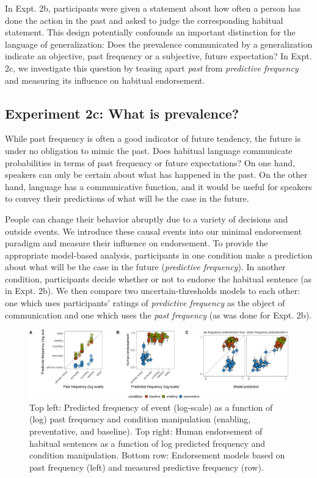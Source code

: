 \documentclass[english,floatsintext,man]{apa6}
\theoremstyle{definition}
\theoremstyle{definition}
\theoremstyle{definition}
\theoremstyle{remark}
\begin{document}
In Expt. 2b, participants were given a statement about how often a
person has done the action in the past and asked to judge the
corresponding habitual statement. This design potentially confounds an
important distinction for the language of generalization: Does the
prevalence communicated by a generalization indicate an objective, past
frequency or a subjective, future expectation? In Expt. 2c, we
investigate this question by teasing apart \emph{past} from
\emph{predictive frequency} and measuring its influence on habitual
endorsement.

\subsection{Experiment 2c: What is
prevalence?}\label{experiment-2c-what-is-prevalence}

While past frequency is often a good indicator of future tendency, the
future is under no obligation to mimic the past. Does habitual language
communicate probabilities in terms of past frequency or future
expectations? On one hand, speakers can only be certain about what has
happened in the past. On the other hand, language has a communicative
function, and it would be useful for speakers to convey their
predictions of what will be the case in the future.

People can change their behavior abruptly due to a variety of decisions
and outside events. We introduce these causal events into our minimal
endorsement paradigm and measure their influence on endorsement. To
provide the appropriate model-based analysis, participants in one
condition make a prediction about what will be the case in the future
(\emph{predictive frequency}). In another condition, participants decide
whether or not to endorse the habitual sentence (as in Expt. 2b). We
then compare two uncertain-thresholds models to each other: one which
uses participants' ratings of \emph{predictive frequency} as the object
of communication and one which uses the \emph{past frequency} (as was
done for Expt. 2b).

\begin{figure}[htbp]
\centering
\includegraphics{figs/habituals-predictive-figure-1.pdf}
\caption{\label{fig:habituals-predictive-figure}Top left: Predicted
frequency of event (log-scale) as a function of (log) past frequency and
condition manipulation (enabling, preventative, and baseline). Top
right: Human endorsement of habitual sentences as a function of log
predicted frequency and condition manipulation. Bottom row: Endorsement
models based on past frequency (left) and measured predictive frequency
(row).}
\end{figure}
\end{document}
